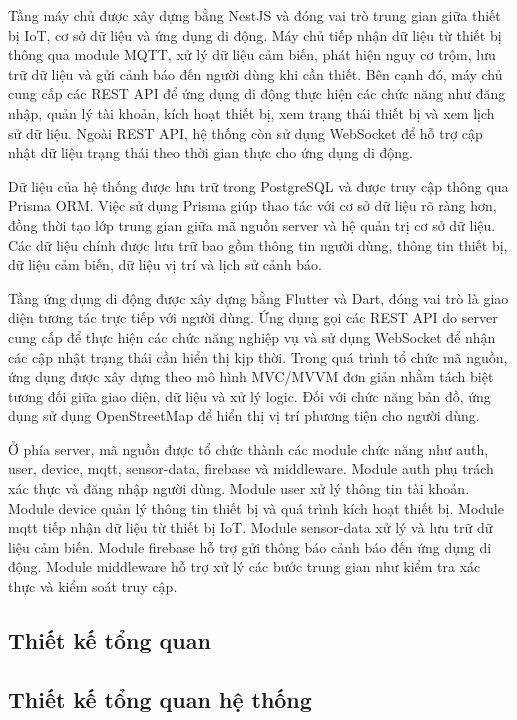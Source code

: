 \documentclass[../DoAn.tex]{subfiles}
\begin{document}
Tầng máy chủ được xây dựng bằng NestJS và đóng vai trò trung gian giữa thiết bị IoT, cơ sở dữ liệu và ứng dụng di động. Máy chủ tiếp nhận dữ liệu từ thiết bị thông qua module MQTT, xử lý dữ liệu cảm biến, phát hiện nguy cơ trộm, lưu trữ dữ liệu và gửi cảnh báo đến người dùng khi cần thiết. Bên cạnh đó, máy chủ cung cấp các REST API để ứng dụng di động thực hiện các chức năng như đăng nhập, quản lý tài khoản, kích hoạt thiết bị, xem trạng thái thiết bị và xem lịch sử dữ liệu. Ngoài REST API, hệ thống còn sử dụng WebSocket để hỗ trợ cập nhật dữ liệu trạng thái theo thời gian thực cho ứng dụng di động.

Dữ liệu của hệ thống được lưu trữ trong PostgreSQL và được truy cập thông qua Prisma ORM. Việc sử dụng Prisma giúp thao tác với cơ sở dữ liệu rõ ràng hơn, đồng thời tạo lớp trung gian giữa mã nguồn server và hệ quản trị cơ sở dữ liệu. Các dữ liệu chính được lưu trữ bao gồm thông tin người dùng, thông tin thiết bị, dữ liệu cảm biến, dữ liệu vị trí và lịch sử cảnh báo.

Tầng ứng dụng di động được xây dựng bằng Flutter và Dart, đóng vai trò là giao diện tương tác trực tiếp với người dùng. Ứng dụng gọi các REST API do server cung cấp để thực hiện các chức năng nghiệp vụ và sử dụng WebSocket để nhận các cập nhật trạng thái cần hiển thị kịp thời. Trong quá trình tổ chức mã nguồn, ứng dụng được xây dựng theo mô hình MVC/MVVM đơn giản nhằm tách biệt tương đối giữa giao diện, dữ liệu và xử lý logic. Đối với chức năng bản đồ, ứng dụng sử dụng OpenStreetMap để hiển thị vị trí phương tiện cho người dùng.

Ở phía server, mã nguồn được tổ chức thành các module chức năng như auth, user, device, mqtt, sensor-data, firebase và middleware. Module auth phụ trách xác thực và đăng nhập người dùng. Module user xử lý thông tin tài khoản. Module device quản lý thông tin thiết bị và quá trình kích hoạt thiết bị. Module mqtt tiếp nhận dữ liệu từ thiết bị IoT. Module sensor-data xử lý và lưu trữ dữ liệu cảm biến. Module firebase hỗ trợ gửi thông báo cảnh báo đến ứng dụng di động. Module middleware hỗ trợ xử lý các bước trung gian như kiểm tra xác thực và kiểm soát truy cập.

\subsection{Thiết kế tổng quan}
\subsection{Thiết kế tổng quan hệ thống}
\label{subsection:4.1.2}
\end{document}
